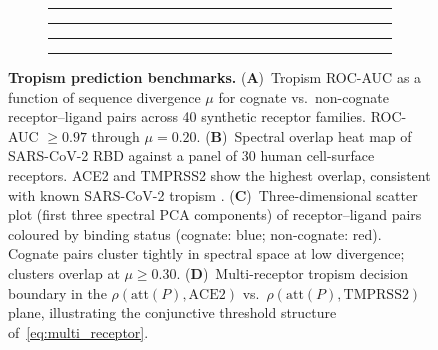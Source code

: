 \documentclass[twocolumn,11pt,a4paper]{article}
\theoremstyle{definition}
\theoremstyle{remark}
\begin{document}
\begin{figure}[t]
\centering
\begin{subfigure}[b]{0.23\textwidth}
  \rule{\textwidth}{0.6\textwidth}
  \caption{}
  \label{fig:trop_auc}
\end{subfigure}
\hfill
\begin{subfigure}[b]{0.23\textwidth}
  \rule{\textwidth}{0.6\textwidth}
  \caption{}
  \label{fig:trop_heatmap}
\end{subfigure}
\hfill
\begin{subfigure}[b]{0.23\textwidth}
  \rule{\textwidth}{0.6\textwidth}
  \caption{}
  \label{fig:trop_scatter}
\end{subfigure}
\hfill
\begin{subfigure}[b]{0.23\textwidth}
  \rule{\textwidth}{0.6\textwidth}
  \caption{}
  \label{fig:trop_boundary}
\end{subfigure}
\caption{\textbf{Tropism prediction benchmarks.}
(\textbf{A})~Tropism ROC-AUC as a function of sequence divergence $\mu$ for
cognate vs.\ non-cognate receptor--ligand pairs across 40 synthetic receptor
families. ROC-AUC $\geq 0.97$ through $\mu = 0.20$.
(\textbf{B})~Spectral overlap heat map of SARS-CoV-2 RBD against a panel of
30 human cell-surface receptors. ACE2 and TMPRSS2 show the highest overlap,
consistent with known SARS-CoV-2 tropism \citep{lan2020, hoffmann2020}.
(\textbf{C})~Three-dimensional scatter plot (first three spectral PCA
components) of receptor--ligand pairs coloured by binding status (cognate:
blue; non-cognate: red). Cognate pairs cluster tightly in spectral space at
low divergence; clusters overlap at $\mu \geq 0.30$.
(\textbf{D})~Multi-receptor tropism decision boundary in the
$\rho(\text{att}(P), \text{ACE2})$ vs.\ $\rho(\text{att}(P), \text{TMPRSS2})$
plane, illustrating the conjunctive threshold structure of~\eqref{eq:multi_receptor}.}
\label{fig:tropism}
\end{figure}
\end{document}
